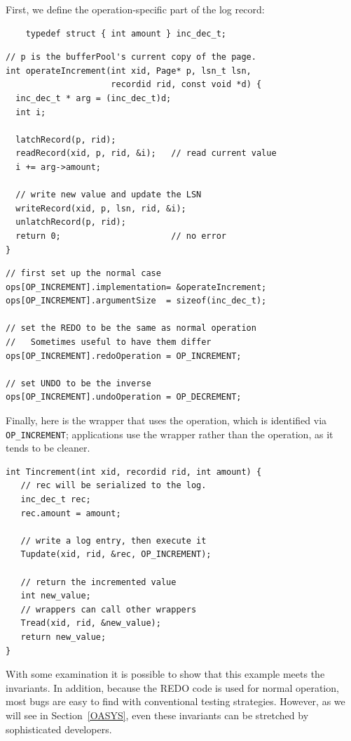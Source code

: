 \documentclass[10pt,letterpaper,twocolumn,english]{article}
\begin{document}
First, we define the operation-specific part of the log record:
\begin{small}
\begin{verbatim}
    typedef struct { int amount } inc_dec_t;
\end{verbatim}
\begin{verbatim}
// p is the bufferPool's current copy of the page.
int operateIncrement(int xid, Page* p, lsn_t lsn,
                     recordid rid, const void *d) {
  inc_dec_t * arg = (inc_dec_t)d;
  int i;

  latchRecord(p, rid); 
  readRecord(xid, p, rid, &i);   // read current value
  i += arg->amount;
  
  // write new value and update the LSN
  writeRecord(xid, p, lsn, rid, &i);
  unlatchRecord(p, rid); 
  return 0;                      // no error
}
\end{verbatim}
\begin{verbatim}
// first set up the normal case
ops[OP_INCREMENT].implementation= &operateIncrement;
ops[OP_INCREMENT].argumentSize  = sizeof(inc_dec_t);

// set the REDO to be the same as normal operation
//   Sometimes useful to have them differ
ops[OP_INCREMENT].redoOperation = OP_INCREMENT;

// set UNDO to be the inverse
ops[OP_INCREMENT].undoOperation = OP_DECREMENT;
\end{verbatim}

{\normalsize Finally, here is the wrapper that uses the
operation, which is identified via {\small\tt OP\_INCREMENT};
applications use the wrapper rather than the operation, as it tends to
be cleaner.}
\begin{verbatim}
int Tincrement(int xid, recordid rid, int amount) {
   // rec will be serialized to the log.
   inc_dec_t rec;
   rec.amount = amount;

   // write a log entry, then execute it
   Tupdate(xid, rid, &rec, OP_INCREMENT);

   // return the incremented value
   int new_value;
   // wrappers can call other wrappers
   Tread(xid, rid, &new_value);
   return new_value;
}
\end{verbatim}
\end{small}


With some examination it is possible to show that this example meets
the invariants.  In addition, because the REDO code is used for normal
operation, most bugs are easy to find with conventional testing
strategies.  However, as we will see in Section~\ref{OASYS}, even
these invariants can be stretched by sophisticated developers.
\end{document}
